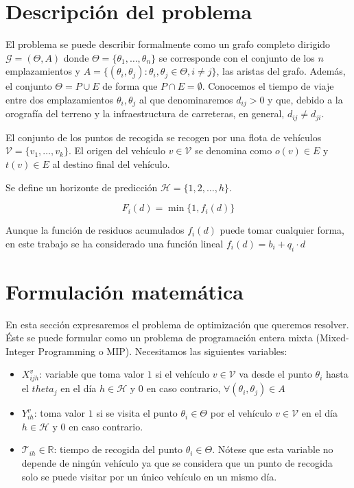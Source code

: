 \documentclass[
]{article}
\providecommand{\tightlist}{%
  \setlength{\itemsep}{0pt}\setlength{\parskip}{0pt}}
\begin{document}
\hypertarget{descripciuxf3n-del-problema}{%
\section{Descripción del problema}\label{descripciuxf3n-del-problema}}

El problema se puede describir formalmente como un grafo completo
dirigido \(\mathcal{G} = (\Theta, A)\) donde
\(\Theta=\{\theta_1,\ldots, \theta_n\}\) se corresponde con el conjunto
de los \(n\) emplazamientos y
\(A=\{(\theta_i,\theta_j):\theta_i,\theta_j\in\Theta, i\neq j\}\), las
aristas del grafo. Además, el conjunto \(\Theta = P \cup E\) de forma
que \(P\cap E = \emptyset\). Conocemos el tiempo de viaje entre dos
emplazamientos \(\theta_i, \theta_j\) al que denominaremos \(d_{ij}>0\)
y que, debido a la orografía del terreno y la infraestructura de
carreteras, en general, \(d_{ij}\neq d_{ji}\).

El conjunto de los puntos de recogida se recogen por una flota de
vehículos \(\mathcal{V} = \{v_1,\ldots, v_k\}\). El origen del vehículo
\(v\in\mathcal{V}\) se denomina como \(o(v)\in E\) y \(t(v)\in E\) al
destino final del vehículo.

Se define un horizonte de predicción \(\mathcal{H}=\{1,2,\ldots, h\}\).

\[
F_i(d) = \min\{1, f_i(d)\}
\]

Aunque la función de residuos acumulados \(f_i(d)\) puede tomar
cualquier forma, en este trabajo se ha considerado una función lineal
\(f_i(d) = b_i + q_i\cdot d\)

\hypertarget{formulaciuxf3n-matemuxe1tica}{%
\section{Formulación matemática}\label{formulaciuxf3n-matemuxe1tica}}

En esta sección expresaremos el problema de optimización que queremos
resolver. Éste se puede formular como un problema de programación entera
mixta (Mixed-Integer Programming o MIP). Necesitamos las siguientes
variables:

\begin{itemize}
\tightlist
\item
  \(X_{ijh}^v\): variable que toma valor \(1\) si el vehículo
  \(v\in\mathcal{V}\) va desde el punto \(\theta_i\) hasta el
  \(theta_j\) en el día \(h\in \mathcal{H}\) y 0 en caso contrario,
  \(\forall (\theta_i,\theta_j) \in A\)
\item
  \(Y_{ih}^v\): toma valor \(1\) si se visita el punto
  \(\theta_i\in\Theta\) por el vehículo \(v\in\mathcal{V}\) en el día
  \(h\in\mathcal{H}\) y 0 en caso contrario.
\item
  \(\mathcal{T}_{ih}\in\mathbb{R}\): tiempo de recogida del punto
  \(\theta_i\in\Theta\). Nótese que esta variable no depende de ningún
  vehículo ya que se considera que un punto de recogida solo se puede
  visitar por un único vehículo en un mismo día.
\end{itemize}
\end{document}
